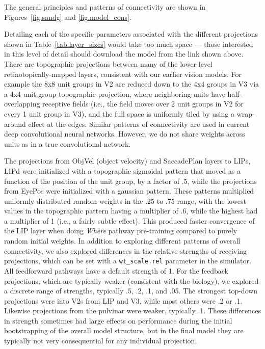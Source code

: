 \documentclass[12pt,twoside]{naturefigs}
\newif\myifpdf
\begin{document}
The general principles and patterns of connectivity are shown in Figures~\ref{fig.sandg} and \ref{fig.model_cons}.

Detailing each of the specific parameters associated with the different projections shown in Table~\ref{tab.layer_sizes} would take too much space --- those interested in this level of detail should download the model from the link shown above.  There are topographic projections between many of the lower-level retinotopically-mapped layers, consistent with our earlier vision models\cite{OReillyWyatteHerdEtAl13}.  For example the 8x8 unit groups in V2 are reduced down to the 4x4 groups in V3 via a 4x4 unit-group topographic projection, where neighboring units have half-overlapping receptive fields (i.e., the field moves over 2 unit groups in V2 for every 1 unit group in V3), and the full space is uniformly tiled by using a wrap-around effect at the edges.  Similar patterns of connectivity are used in current deep convolutional neural networks.  However, we do not share weights across units as in a true convolutional network.

The projections from ObjVel (object velocity) and SaccadePlan layers to LIPs, LIPd were initialized with a topographic sigmoidal pattern that moved as a function of the position of the unit group, by a factor of .5, while the projections from EyePos were initialized with a gaussian pattern.  These patterns multiplied uniformly distributed random weights in the .25 to .75 range, with the lowest values in the topographic pattern having a multiplier of .6, while the highest had a multiplier of 1 (i.e., a fairly subtle effect).  This produced faster convergence of the LIP layer when doing {\em Where} pathway pre-training compared to purely random initial weights.  In addition to exploring different patterns of overall connectivity, we also explored differences in the relative strengths of receiving projections, which can be set with a \texttt{wt\_scale.rel} parameter in the simulator.  All feedforward pathways have a default strength of 1.  For the feedback projections, which are typically weaker (consistent with the biology), we explored a discrete range of strengths, typically .5, .2, .1, and .05.  The strongest top-down projections were into V2s from LIP and V3, while most others were .2 or .1.  Likewise projections from the pulvinar were weaker, typically .1.  These differences in strength sometimes had large effects on performance during the initial bootstrapping of the overall model structure, but in the final model they are typically not very consequential for any individual projection.
\end{document}
